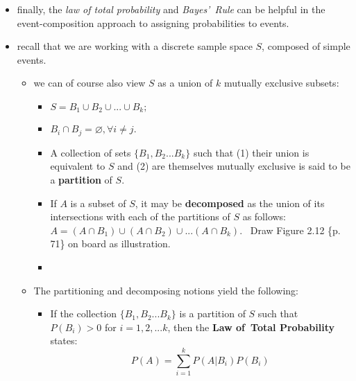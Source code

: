 \documentclass[11pt]{article}
\begin{document}
\begin{itemize}
\item finally, the \textit{law of total probability} and \textit{Bayes'\ Rule%
} can be helpful in the event-composition approach to assigning
probabilities to events.

\item recall that we are working with a discrete sample space $S$, composed
of simple events.

\begin{itemize}
\item we can of course also view $S$ as a union of $k$ mutually exclusive
subsets:

\begin{itemize}
\item $S=B_{1}\cup B_{2}\cup ...\cup B_{k};$

\item $B_{i}\cap B_{j}=\varnothing ,\forall i\neq j.$

\item A collection of sets $\{B_{1},B_{2}...B_{k}\}$ such that (1) their
union is equivalent to $S$ and (2) are themselves mutually exclusive is said
to be a \textbf{partition }of $S$.

\item If $A$ is a subset of $S$, it may be \textbf{decomposed }as the union
of its intersections with each of the partitions of $S$ as follows: \ $%
A=(A\cap B_{1})\cup (A\cap B_{2})\cup ...(A\cap B_{k}).$ \ Draw Figure 2.12
\{p. 71\} on board as illustration.

\item {}
\end{itemize}

\item The partitioning and decomposing notions yield the following:

\begin{itemize}
\item If the collection $\{B_{1},B_{2}...B_{k}\}$ is a partition of $S$ such
that $P(B_{i})>0$ for $i=1,2,...k$, then the \textbf{Law of\ Total
Probability }states:%
\begin{equation*}
P(A)=\sum_{i=1}^{k}P(A|B_{i})P(B_{i})
\end{equation*}


\end{itemize}
\end{itemize}
\end{itemize}
\end{document}
